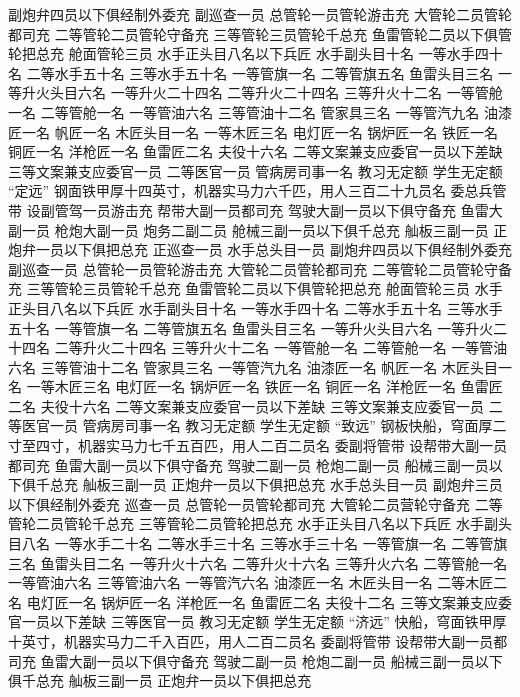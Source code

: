 \documentclass[12pt,UTF8]{ctexbook}
\begin{document}
副炮弁四员以下俱经制外委充
副巡查一员
总管轮一员管轮游击充
大管轮二员管轮都司充
二等管轮二员管轮守备充
三等管轮三员管轮千总充
鱼雷管轮二员以下俱管轮把总充
舱面管轮三员
水手正头目八名以下兵匠
水手副头目十名
一等水手四十名
二等水手五十名
三等水手五十名
一等管旗一名
二等管旗五名
鱼雷头目三名
一等升火头目六名
一等升火二十四名
二等升火二十四名
三等升火十二名
一等管舱一名
二等管舱一名
一等管油六名
三等管油十二名
管家具三名
一等管汽九名
油漆匠一名
帆匠一名
木匠头目一名
一等木匠三名
电灯匠一名
锅炉匠一名
铁匠一名
铜匠一名
洋枪匠一名
鱼雷匠二名
夫役十六名
二等文案兼支应委官一员以下差缺
三等文案兼支应委官一员
二等医官一员
管病房司事一名
教习无定额
学生无定额
“定远”
钢面铁甲厚十四英寸，机器实马力六千匹，用人三百二十九员名
委总兵管带
设副管驾一员游击充
帮带大副一员都司充
驾驶大副一员以下俱守备充
鱼雷大副一员
枪炮大副一员
炮务二副二员
舱械三副一员以下俱千总充
舢板三副一员
正炮弁一员以下俱把总充
正巡查一员
水手总头目一员
副炮弁四员以下俱经制外委充
副巡查一员
总管轮一员管轮游击充
大管轮二员管轮都司充
二等管轮二员管轮守备充
三等管轮三员管轮千总充
鱼雷管轮二员以下俱管轮把总充
舱面管轮三员
水手正头目八名以下兵匠
水手副头目十名
一等水手四十名
二等水手五十名
三等水手五十名
一等管旗一名
二等管旗五名
鱼雷头目三名
一等升火头目六名
一等升火二十四名
二等升火二十四名
三等升火十二名
一等管舱一名
二等管舱一名
一等管油六名
三等管油十二名
管家具三名
一等管汽九名
油漆匠一名
帆匠一名
木匠头目一名
一等木匠三名
电灯匠一名
锅炉匠一名
铁匠一名
铜匠一名
洋枪匠一名
鱼雷匠二名
夫役十六名
二等文案兼支应委官一员以下差缺
三等文案兼支应委官一员
二等医官一员
管病房司事一名
教习无定额
学生无定额
“致远”
钢板快船，穹面厚二寸至四寸，机器实马力七千五百匹，用人二百二员名
委副将管带
设帮带大副一员都司充
鱼雷大副一员以下俱守备充
驾驶二副一员
枪炮二副一员
船械三副一员以下俱千总充
舢板三副一员
正炮弁一员以下俱把总充
水手总头目一员
副炮弁三员以下俱经制外委充
巡查一员
总管轮一员管轮都司充
大管轮二员营轮守备充
二等管轮二员管轮千总充
三等管轮二员管轮把总充
水手正头目八名以下兵匠
水手副头目八名
一等水手二十名
二等水手三十名
三等水手三十名
一等管旗一名
二等管旗三名
鱼雷头目二名
一等升火十六名
二等升火十六名
三等升火六名
二等管舱一名
一等管油六名
三等管油六名
一等管汽六名
油漆匠一名
木匠头目一名
二等木匠二名
电灯匠一名
锅炉匠一名
洋枪匠一名
鱼雷匠二名
夫役十二名
三等文案兼支应委官一员以下差缺
三等医官一员
教习无定额
学生无定额
“济远”
快船，穹面铁甲厚十英寸，机器实马力二千入百匹，用人二百二员名
委副将管带
设帮带大副一员都司充
鱼雷大副一员以下俱守备充
驾驶二副一员
枪炮二副一员
船械三副一员以下俱千总充
舢板三副一员
正炮弁一员以下俱把总充
\end{document}
